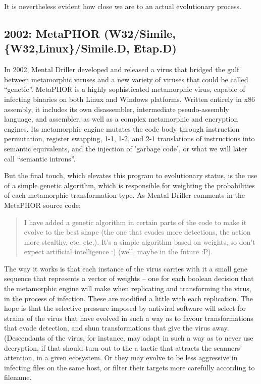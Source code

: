 \documentclass[12pt,glossary]{dalthesis}
\begin{document}
It is nevertheless evident how close we are to an actual evolutionary process.

\subsection{2002: MetaPHOR (W32/Simile, \{W32,Linux\}/Simile.D, Etap.D)}
\label{sec:org6664264}

In 2002, Mental Driller developed and released a virus that bridged the gulf
between metamorphic viruses and a new variety of viruses that could be called
``genetic''. MetaPHOR is a highly sophisticated metamorphic virus, capable of
infecting binaries on both Linux and Windows platforms. Written entirely in x86
assembly, it includes its own disassembler, intermediate pseudo-assembly
language, and assembler, as well as a complex metamorphic and encryption
engines. Its metamorphic engine mutates the code body through instruction
permutation, register swapping, 1-1, 1-2, and 2-1 translations of instructions
into semantic equivalents, and the injection of 'garbage code', or what we will
later call ``semantic introns''.

But the final touch, which elevates this program to evolutionary status, is the
use of a simple genetic algorithm, which is responsible for weighting the
probabilities of each metamorphic transformation type. As Mental Driller
comments in the MetaPHOR source code:

\begin{quote}
  I have added a genetic algorithm in certain parts of the code to make it
evolve to the best shape (the one that evades more detections, the action more
stealthy, etc. etc.). It's a simple algorithm based on weights, so don't expect
artificial intelligence :) (well, maybe in the future :P). 
\end{quote}

 The way it works is that each instance of the virus carries with it a small
gene sequence that represents a vector of weights -- one for each boolean
decision that the metamorphic engine will make when replicating and transforming
the virus, in the process of infection. These are modified a little with each
replication. The hope is that the selective pressure imposed by
antiviral software will select for strains of the virus that have evolved in
such a way as to favour transformations that evade detection, and shun
transformations that give the virus away. (Descendants of the virus, for
instance, may adapt in such a way as to never use decryption, if that should
turn out to the a tactic that attracts the scanners' attention, in a given
ecosystem. Or they may evolve to be less aggressive in infecting files on the
same host, or filter their targets more carefully according to filename.
\end{document}
